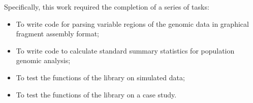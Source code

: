 Specifically, this work required the completion of a series of tasks:
\begin{itemize}
    \item To write code for parsing variable regions of the genomic data in graphical fragment assembly format; 
    \item To write code to calculate standard summary statistics for population genomic analysis; 
    \item To test the functions of the library on simulated data;
    \item To test the functions of the library on a case study.
\end{itemize}




